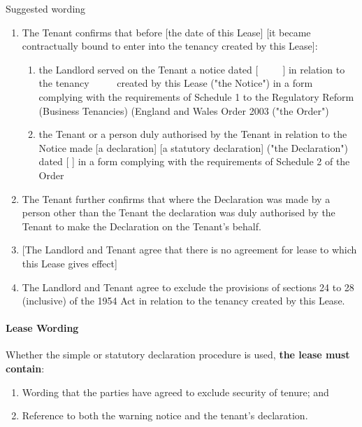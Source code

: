 \documentclass[
]{article}
\providecommand{\tightlist}{%
  \setlength{\itemsep}{0pt}\setlength{\parskip}{0pt}}
\newenvironment{env-8fa37bb4-768d-4893-9e93-b3dc64db7fb6}
{
    \savenotes\tcolorbox[blanker,breakable,left=5pt,borderline west={2pt}{-4pt}{purple}]
}
{
    \endtcolorbox\spewnotes
}
\begin{document}
\begin{env-8fa37bb4-768d-4893-9e93-b3dc64db7fb6}

Suggested wording

\begin{enumerate}
\tightlist
\item
  The Tenant confirms that before {[}the date of this Lease{]} {[}it
  became contractually bound to enter into the tenancy created by this
  Lease{]}:

  \begin{enumerate}
  \tightlist
  \item
    the Landlord served on the Tenant a notice dated {[} ~ ~ ~{]} in
    relation to the tenancy ~ ~ ~ created by this Lease ("the Notice")
    in a form complying with the requirements of Schedule 1 to the
    Regulatory Reform (Business Tenancies) (England and Wales Order 2003
    ("the Order")
  \item
    the Tenant or a person duly authorised by the Tenant in relation to
    the Notice made {[}a declaration{]} {[}a statutory declaration{]}
    ("the Declaration") dated {[} {]} in a form complying with the
    requirements of Schedule 2 of the Order
  \end{enumerate}
\item
  The Tenant further confirms that where the Declaration was made by a
  person other than the Tenant the declaration was duly authorised by
  the Tenant to make the Declaration on the Tenant's behalf.
\item
  {[}The Landlord and Tenant agree that there is no agreement for lease
  to which this Lease gives effect{]}
\item
  The Landlord and Tenant agree to exclude the provisions of sections 24
  to 28 (inclusive) of the 1954 Act in relation to the tenancy created
  by this Lease.
\end{enumerate}

\end{env-8fa37bb4-768d-4893-9e93-b3dc64db7fb6}

\hypertarget{lease-wording}{%
\paragraph{Lease Wording}\label{lease-wording}}

Whether the simple or statutory declaration procedure is used,
\textbf{the lease must contain}:

\begin{enumerate}
\tightlist
\item
  Wording that the parties have agreed to exclude security of tenure;
  and
\item
  Reference to both the warning notice and the tenant's declaration.
\end{enumerate}
\end{document}
